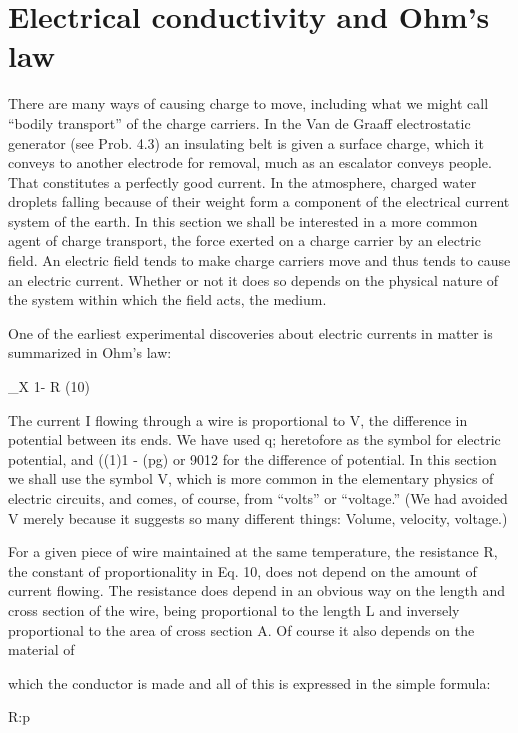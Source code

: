 \section{Electrical conductivity and Ohm's law}

There are many ways of causing charge to move, including what
we might call ``bodily transport'' of the charge carriers. In the
Van de Graaff electrostatic generator (see Prob. 4.3) an insulating
belt is given a surface charge, which it conveys to another electrode
for removal, much as an escalator conveys people. That constitutes
a perfectly good current. In the atmosphere, charged water droplets
falling because of their weight form a component of the electrical
current system of the earth. In this section we shall be interested in
a more common agent of charge transport, the force exerted on a
charge carrier by an electric field. An electric field tends to make
charge carriers move and thus tends to cause an electric current.
Whether or not it does so depends on the physical nature of the system
within which the field acts, the medium.

One of the earliest experimental discoveries about electric currents
in matter is summarized in Ohm's law:

_X
1- R (10)
\begin{equation}
\end{equation}

The current I flowing through a wire is proportional to V, the difference
in potential between its ends. We have used q; heretofore as
the symbol for electric potential, and ((1)1 - (pg) or 9012 for the difference
of potential. In this section we shall use the symbol V, which
is more common in the elementary physics of electric circuits, and
comes, of course, from ``volts'' or ``voltage.'' (We had avoided V
merely because it suggests so many different things: Volume, velocity,
voltage.)

For a given piece of wire maintained at the same temperature, the
resistance R, the constant of proportionality in Eq. 10, does not depend
on the amount of current flowing. The resistance does depend
in an obvious way on the length and cross section of the wire, being
proportional to the length L and inversely proportional to the area
of cross section A. Of course it also depends on the material of

which the conductor is made and all of this is expressed in the simple
formula:

R:p%
\begin{equation}
\end{equation}

